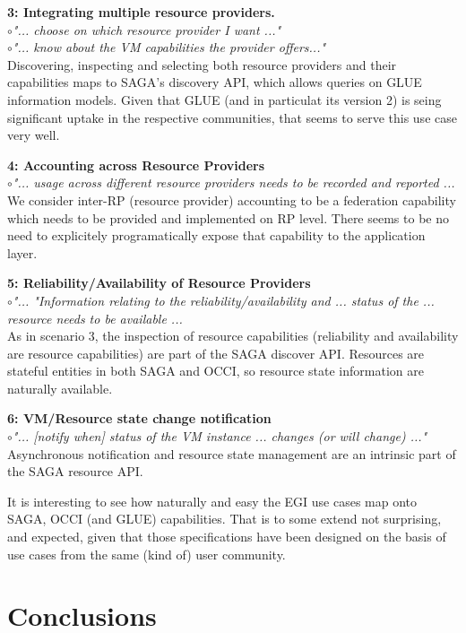 \documentclass[10pt,conference,final,letterpaper,twoside,twocolumn,]{IEEEtran}
\newcommand{\I}[1]{\textit{#1}}
\newcommand{\B}[1]{\textbf{#1}}
\newcommand{\bull}{$\circ$}
\begin{document}
  \noindent
  \B{3: Integrating multiple resource providers.}\\
  \bull \I{"... choose on which resource provider I want ..."}\\
  \bull \I{"... know about the VM capabilities the provider offers..."}\\
  Discovering, inspecting and selecting both resource providers and
  their capabilities maps to SAGA's discovery API, which allows
  queries on GLUE information models.  Given that GLUE (and in
  particulat its version 2) is seing significant uptake in the
  respective communities, that seems to serve this use case very well.  

  \noindent
  \B{4: Accounting across Resource Providers}\\
  \bull \I{"... usage across different resource providers needs to be
  recorded and reported ... }\\
  We consider inter-RP (resource provider) accounting to be a federation 
  capability which needs to be provided and implemented on RP level.
  There seems to be no need to explicitely programatically expose that 
  capability to the application layer.

  \noindent
  \B{5: Reliability/Availability of Resource Providers}\\
  \bull \I{"... "Information relating to the reliability/availability 
  and ... status of the ... resource needs to be available ...}\\
  As in scenario 3, the inspection of resource capabilities
  (reliability and availability are resource capabilities) are part of
  the SAGA discover API.  Resources are stateful entities in both SAGA
  and OCCI, so resource state information are naturally available.

  \noindent
  \B{6: VM/Resource state change notification}\\
  \bull \I{"... [notify when] status of the VM instance ...
  changes (or will change) ..."}\\ 
  Asynchronous notification and resource state management are an
  intrinsic part of the SAGA resource API.

  It is interesting to see how naturally and easy the EGI use cases
  map onto SAGA, OCCI (and GLUE) capabilities.  That is to some extend
  not surprising, and expected, given that those specifications have
  been designed on the basis of use cases from the same (kind of) user
  community.




\section{Conclusions}
\end{document}
